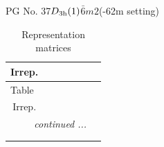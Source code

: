 \documentclass[fleqn,8pt,landscape]{jsarticle}
\begin{document}
\setcounter{MaxMatrixCols}{32}

\renewcommand{\tablename}{Table~}
\renewcommand{\figurename}{Figure~}
\begin{center}
\LARGE
PG No. 37\quad$D_{\rm 3h}(1)$\quad$\bar{6}m2$\quad(-62m setting)\quad[ hexagonal ]
\end{center}
\renewcommand{\arraystretch}{1.2}
\begin{longtable}{ccccccc}
\caption{Representation matrices}
 \\
 \hline \hline
Irrep. &  &  &  &  &  &  \\ \hline \endfirsthead

\multicolumn{6}{l}{\tablename\ \thetable{}} \\
 \hline \hline
Irrep. &  &  &  &  &  &  \\ \hline \endhead

 \hline \hline
\multicolumn{6}{r}{\footnotesize\it continued ...} \\ \endfoot

 \hline \hline
\multicolumn{6}{r}{} \\ \endlastfoot


\end{longtable}
\end{document}
